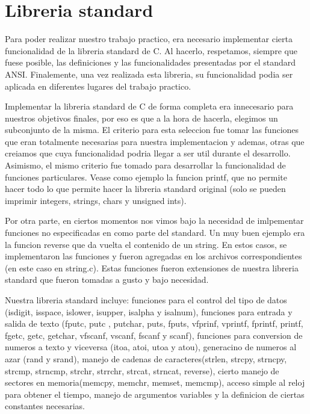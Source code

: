 \documentclass[a4paper,10pt]{article}
\begin{document}
\section{Libreria standard}
    Para poder realizar nuestro trabajo practico, era necesario implementar cierta funcionalidad de la libreria standard de C. Al hacerlo, respetamos, siempre que fuese posible, las definiciones y las funcionalidades presentadas por el standard ANSI.
    Finalemente, una vez realizada esta libreria, su funcionalidad podia ser aplicada en diferentes lugares del trabajo practico.

    Implementar la libreria standard de C de forma completa era innecesario para nuestros objetivos finales, por eso es que a la hora de hacerla, elegimos un subconjunto de la misma. El criterio para esta seleccion fue tomar las funciones que eran totalmente necesarias para nuestra implementacion y ademas, otras que creiamos que cuya funcionalidad podria llegar a ser util durante el desarrollo.
    Asimismo, el mismo criterio fue tomado para desarrollar la funcionalidad de funciones particulares. Vease como ejemplo la funcion printf, que no permite hacer todo lo que permite hacer la libreria standard original (solo se pueden imprimir integers, strings, chars y unsigned ints).

    Por otra parte, en ciertos momentos nos vimos bajo la necesidad de imlpementar funciones no especificadas en como parte del standard. Un muy buen ejemplo era la funcion reverse que da vuelta el contenido de un string. En estos casos, se implementaron las funciones y fueron agregadas en los archivos correspondientes (en este caso en string.c). Estas funciones fueron extensiones de nuestra libreria standard que fueron tomadas a gusto y bajo necesidad.

    Nuestra libreria standard incluye: funciones para el control del tipo de datos (isdigit, isspace, islower, isupper, isalpha y isalnum), funciones para entrada y salida de texto (fputc, putc , putchar, puts, fputs, vfprinf, vprintf, fprintf, printf, fgetc, getc, getchar, vfscanf, vscanf, fscanf y scanf), funciones para conversion de numeros a texto y viceversa (itoa, atoi, utoa y atou), generacino de numeros al azar (rand y srand), manejo de cadenas de caracteres(strlen, strcpy, strncpy, strcmp, strncmp, strchr, strrchr, strcat, strncat, reverse), cierto manejo de sectores en memoria(memcpy, memchr, memset, memcmp), acceso simple al reloj para obtener el tiempo, manejo de argumentos variables y la definicion de ciertas constantes necesarias.
\end{document}
